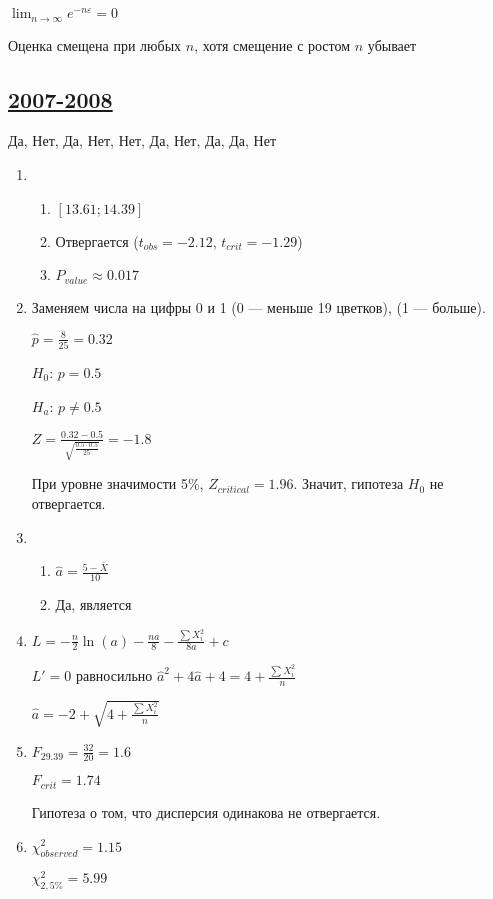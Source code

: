 \begin{enumerate}[resume]
$\lim_{n\to\infty} e^{-n\varepsilon} =0$

Оценка смещена при любых $n$, хотя смещение с ростом $n$ убывает

\subsection[2007-2008]{\hyperref[sec:kr_03_2007_2008]{2007-2008}}
\label{sec:sol_kr_03_2007_2008}

Да, Нет, Да, Нет, Нет, Да, Нет, Да, Да, Нет


\begin{enumerate}
\item
\begin{enumerate}
\item $[13.61;14.39]$
\item Отвергается ($t_{obs} = -2.12$, $t_{crit} = -1.29$)
\item $P_{value} \approx 0.017$
\end{enumerate}
\item Заменяем числа на цифры 0 и 1 (0 — меньше 19 цветков), (1 — больше).

$\hat{p}=\frac{8}{25}=0.32$

$H_{0}$: $p=0.5$

$H_{a}$: $p\neq 0.5$

$Z=\frac{0.32-0.5}{\sqrt{\frac{0.5\cdot 0.5}{25}}}=-1.8$

При уровне значимости 5\%, $Z_{critical}=1.96$. Значит, гипотеза $H_{0}$ не отвергается.
\item
\begin{enumerate}
\item $\hat{a}=\frac{5-\bar{X}}{10}$
\item Да, является
\end{enumerate}
\item $L=-\frac{n}{2}\ln(a)-\frac{na}{8}-\frac{\sum X_{i}^{2}}{8a}+c$

$L'=0$ равносильно $\hat{a}^{2}+4\hat{a}+4=4+\frac{\sum X_{i}^{2}}{n}$

$\hat{a}=-2+\sqrt{4+\frac{\sum X_{i}^{2}}{n}}$
\item $F_{29.39}=\frac{32}{20}=1.6$

$F_{crit}=1.74$

Гипотеза о том, что дисперсия одинакова не отвергается.
\item $\chi^{2}_{observed}=1.15$

$\chi^{2}_{2,5\%}=5.99$


\end{enumerate}
\end{enumerate}
